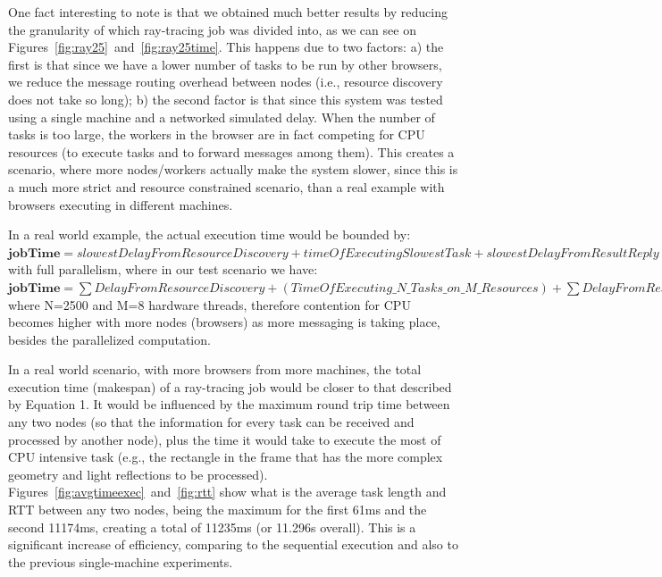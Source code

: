 One fact interesting to note is that we obtained much better results by reducing the granularity of which ray-tracing job was divided into, as we can see on Figures~\ref{fig:ray25}~and~\ref{fig:ray25time}. This happens due to two factors: a) the first is that since we have a lower number of tasks to be run by other browsers, we reduce the message routing overhead between nodes (i.e., resource discovery does not take so long); b) the second factor is that since this system was tested using a single machine and a networked simulated delay. When the number of tasks is too large, the workers in the browser are in fact competing for CPU resources (to execute tasks and to forward messages among them). This creates a scenario, where more nodes/workers actually  make the system slower, since this is a much more strict and resource constrained scenario, than a real example with browsers executing in different machines.

In a real world example, the actual execution time would be bounded by:\\

$\textbf{jobTime}=slowestDelayFromResourceDiscovery+timeOfExecutingSlowestTask+slowestDelayFromResultReply (1)$ \\

with full parallelism, where in our test scenario we have: \\

$\textbf{jobTime}=\sum{DelayFromResourceDiscovery}+(TimeOfExecuting\_N\_Tasks\_on\_M\_Resources)+\sum{DelayFromResultReply} (2)$\\

where N=2500 and M=8 hardware threads, therefore contention for CPU becomes higher with more nodes (browsers) as more messaging is taking place, besides the parallelized computation.

In a real world scenario, with more browsers from more machines, the total execution time (makespan) of a ray-tracing job would be closer to that described by Equation 1. It would be influenced by the maximum round trip time between any two nodes (so that the information for every task can be received and processed by another node), plus the time it would take to execute the most of CPU intensive task (e.g., the rectangle in the frame that has the more complex geometry and light reflections to be processed). Figures~\ref{fig:avgtimeexec}~and~\ref{fig:rtt} show what is the average task length and RTT between any two nodes, being the maximum for the first 61ms and the second 11174ms, creating a total of 11235ms (or 11.296s overall). This is a significant increase of efficiency, comparing to the sequential execution and also to the previous single-machine experiments.

